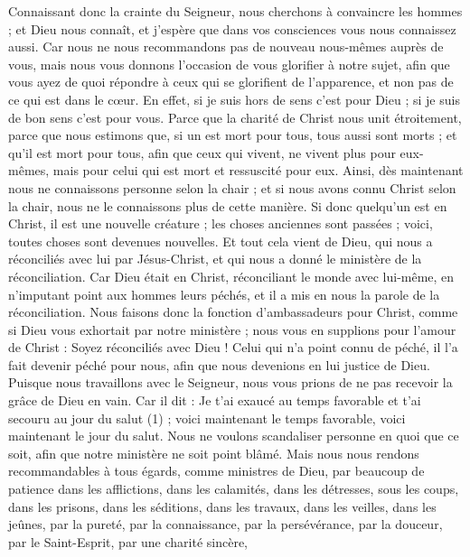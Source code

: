 \begin{multicols}{2}
Connaissant donc la crainte du Seigneur, nous cherchons à convaincre les hommes ; et Dieu nous connaît, et j’espère que dans vos consciences vous nous connaissez aussi.
Car nous ne nous recommandons pas de nouveau nous-mêmes auprès de vous, mais nous vous donnons l'occasion de vous glorifier à notre sujet, afin que vous ayez de quoi répondre à ceux qui se glorifient de l'apparence, et non pas de ce qui est dans le cœur.
En effet, si je suis hors de sens c’est pour Dieu ; si je suis de bon sens c’est pour vous.
Parce que la charité de Christ nous unit étroitement, parce que nous estimons que, si un est mort pour tous, tous aussi sont morts ;
et qu'il est mort pour tous, afin que ceux qui vivent, ne vivent plus pour eux-mêmes, mais pour celui qui est mort et ressuscité pour eux.
Ainsi, dès maintenant nous ne connaissons personne selon la chair ; et si nous avons connu Christ selon la chair, nous ne le connaissons plus de cette manière.
Si donc quelqu'un est en Christ, il est une nouvelle créature ; les choses anciennes sont passées ; voici, toutes choses sont devenues nouvelles.
Et tout cela vient de Dieu, qui nous a réconciliés avec lui par Jésus-Christ, et qui nous a donné le ministère de la réconciliation.
Car Dieu était en Christ, réconciliant le monde avec lui-même, en n’imputant point aux hommes leurs péchés, et il a mis en nous la parole de la réconciliation.
Nous faisons donc la fonction d’ambassadeurs pour Christ, comme si Dieu vous exhortait par notre ministère ; nous vous en supplions pour l’amour de Christ : Soyez réconciliés avec Dieu !
Celui qui n’a point connu de péché, il l’a fait devenir péché pour nous, afin que nous devenions en lui justice de Dieu.
\VerseOne{}Puisque nous travaillons avec le Seigneur, nous vous prions de ne pas recevoir la grâce de Dieu en vain.
Car il dit : Je t'ai exaucé au temps favorable et t'ai secouru au jour du salut (1) ; voici maintenant le temps favorable, voici maintenant le jour du salut.
Nous ne voulons scandaliser personne en quoi que ce soit, afin que notre ministère ne soit point blâmé.
Mais nous nous rendons recommandables à tous égards, comme ministres de Dieu, par beaucoup de patience dans les afflictions, dans les calamités, dans les détresses,
sous les coups, dans les prisons, dans les séditions, dans les travaux, dans les veilles, dans les jeûnes,
par la pureté, par la connaissance, par la persévérance, par la douceur, par le Saint-Esprit, par une charité sincère,

\end{multicols}
